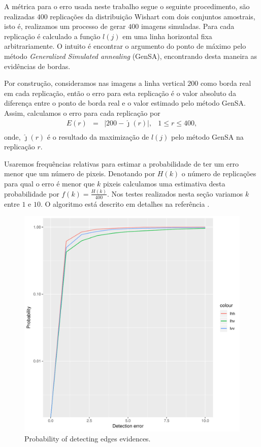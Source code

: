 \documentclass[conference]{IEEEtran}
\begin{document}
	A métrica para o erro usada neste trabalho segue o seguinte procedimento, são realizadas $400$ replicações da distribuição Wishart com dois conjuntos amostrais, isto é, realizamos um processo de gerar $400$ imagens simuladas. Para cada replicação é calculado a função $l(j)$ em uma linha horizontal fixa arbitrariamente. O intuito é encontrar o argumento do ponto de máximo pelo método {\it Generalized Simulated annealing} (GenSA), encontrando desta maneira as evidências de bordas.
	
	 Por construção, consideramos nas imagens a linha vertical $200$ como borda real em cada replicação, então o erro para esta replicação é o valor absoluto da diferença entre o ponto de borda real e o valor estimado pelo método GenSA. Assim, calculamos o erro para cada replicação por   
\begin{equation}\label{eq_12}
\begin{array}{llll}
	E(r) &=& |200 - \hat{\jmath}(r)|, & 1\leq r \leq 400,  \\
\end{array}
\end{equation}
onde, $\hat{\jmath}(r)$ é o resultado da maximização de $l(j)$ pelo método GenSA na replicação $r$.

Usaremos frequências relativas para estimar a probabilidade de ter um erro menor que um número de pixeis. Denotando por $H(k)$ o número de replicações para qual o erro é menor que $k$ pixeis calculamos uma estimativa desta probabilidade por $f(k)=\frac{H(k)}{400}$. Nos testes realizados nesta seção variamos $k$ entre $1$ e $10$. O algoritmo está descrito em detalhes na referência \cite{fbgm}. 


\begin{figure}[hbt]
	\centering
	\includegraphics[width=.7\linewidth]{metricas_ihh_ivh_ivv_nhfc_artigos}%
	\caption{Probability of detecting edges evidences.}
\label{probability_edge_detc}
\end{figure}
\end{document}

